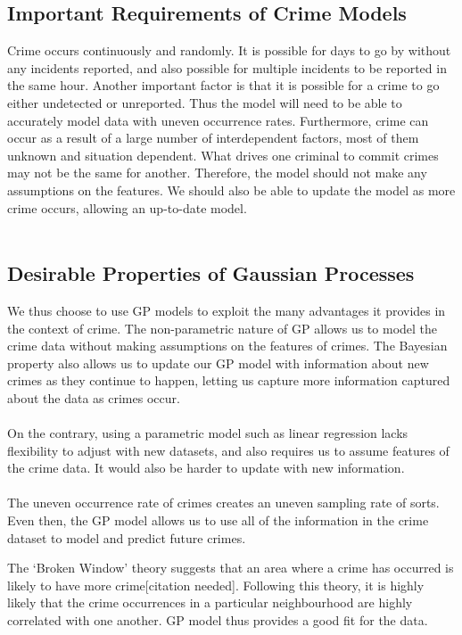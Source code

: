 \documentclass[a4paper, 10pt, conference]{ieeeconf}
\begin{document}
	\subsection{Important Requirements of Crime Models}
	
	Crime occurs continuously and randomly. It is possible for days to go by without any incidents reported, and also possible for multiple incidents to be reported in the same hour.
	Another important factor is that it is possible for a crime to go either undetected or unreported. Thus the model will need to be able to accurately model data with uneven occurrence rates.
	Furthermore, crime can occur as a result of a large number of interdependent factors, most of them unknown and situation dependent. What drives one criminal to commit crimes may not be the same for another.
	Therefore, the model should not make any assumptions on the features. We should also be able to update the model as more crime occurs, allowing an up-to-date model.\\ \\
	\blindtext
	
	\subsection{Desirable Properties of Gaussian Processes}
	
	We thus choose to use GP models to exploit the many advantages it provides in the context of crime.
	The non-parametric nature of GP allows us to model the crime data without making assumptions on the features of crimes.
	The Bayesian property also allows us to update our GP model with information about new crimes as they continue to happen, letting us capture more information captured about the data as crimes occur.\\ \\

	On the contrary, using a parametric model such as linear regression lacks flexibility to adjust with new datasets, and also requires us to assume features of the crime data.
	It would also be harder to update with new information.\\ \\

	The uneven occurrence rate of crimes creates an uneven sampling rate of sorts.
	Even then, the GP model allows us to use all of the information in the crime dataset to model and predict future crimes.

	The ‘Broken Window’ theory suggests that an area where a crime has occurred is likely to have more crime[citation needed].
	Following this theory, it is highly likely that the crime occurrences in a particular neighbourhood are highly correlated with one another.
	GP model thus provides a good fit for the data.
\end{document}
